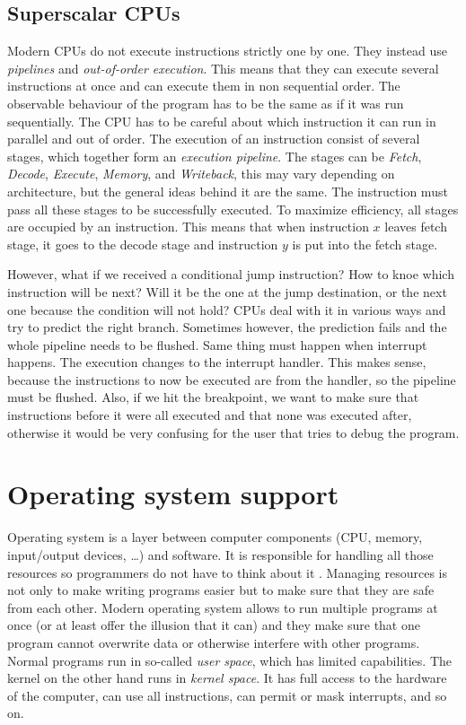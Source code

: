 \subsection{Superscalar CPUs}
Modern CPUs do not execute instructions strictly one by one. They instead use
\textit{pipelines} and \textit{out-of-order execution}. This means that they
can execute several instructions at once and can execute them in non sequential
order. The observable behaviour of the program has to be the same as if it was
run sequentially. The CPU has to be careful about which instruction it can run
in parallel and out of order. The execution of an instruction consist of
several stages, which together form an \textit{execution pipeline}. The stages
can be \textit{Fetch}, \textit{Decode}, \textit{Execute}, \textit{Memory}, and
\textit{Writeback}, this may vary depending on architecture, but the general
ideas behind it are the same. The instruction must pass all these stages to be
successfully executed. To maximize efficiency, all stages are occupied by an
instruction. This means that when instruction $x$ leaves fetch stage, it goes
to the decode stage and instruction $y$ is put into the fetch stage.

However, what if we received a conditional jump instruction? How to knoe which
instruction will be next? Will it be the one at the jump destination, or the
next one because the condition will not hold? CPUs deal with it in various ways
and try to predict the right branch. Sometimes however, the prediction fails
and the whole pipeline needs to be flushed. Same thing must happen when
interrupt happens. The execution changes to the interrupt handler. This makes
sense, because the instructions to now be executed are from the handler, so the
pipeline must be flushed. Also, if we hit the breakpoint, we want to make sure
that instructions before it were all executed and that none was executed after,
otherwise it would be very confusing for the user that tries to debug the
program.

\section{Operating system support}
Operating system is a layer between computer components (CPU, memory,
input/output devices, \dots) and software. It is responsible for handling all
those resources so programmers do not have to think about it \cite{modern-os,
os-concepts}. Managing resources is not only to make writing programs easier
but to make sure that they are safe from each other. Modern operating system
allows to run multiple programs at once (or at least offer the illusion that it
can) and they make sure that one program cannot overwrite data or otherwise
interfere with other programs. Normal programs run in so-called \textit{user
space}, which has limited capabilities. The kernel on the other hand runs in
\textit{kernel space}. It has full access to the hardware of the computer, can
use all instructions, can permit or mask interrupts, and so on.

